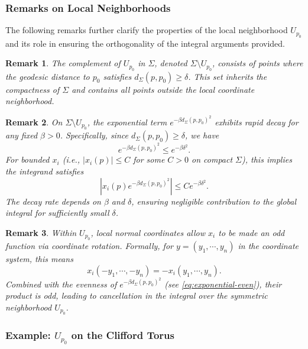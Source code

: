 \documentclass[a4, 12pt]{amsart}
\numberwithin{equation}{section} \numberwithin{equation}{section}
\newtheorem{rem}{Remark}[section]{\bfseries\upshape}
\begin{document}
\subsubsection{Remarks on Local Neighborhoods}

The following remarks further clarify the properties of the local neighborhood $U_{p_0}$ and its role in ensuring the orthogonality of the integral arguments provided.
\begin{rem}\label{rem:complement}
The complement of $ U_{p_0} $ in $ \Sigma $, denoted $ \Sigma \setminus U_{p_0} $, consists of points where the geodesic distance to $ p_0 $ satisfies $ d_{\Sigma}(p, p_0) \geq \delta $. This set inherits the compactness of $ \Sigma $ and contains all points outside the local coordinate neighborhood.
\end{rem}

\begin{rem}\label{rem:exponential-decay}
On $ \Sigma \setminus U_{p_0} $, the exponential term $ e^{-\beta d_{\Sigma}(p, p_0)^2} $ exhibits rapid decay for any fixed $ \beta > 0 $. Specifically, since $ d_{\Sigma}(p, p_0) \geq \delta $, we have
\begin{equation*}
e^{-\beta d_{\Sigma}(p, p_0)^2} \leq e^{-\beta \delta^2}.
\end{equation*}
For bounded $ x_i $ (i.e., $ |x_i(p)| \leq C $ for some $ C > 0 $ on compact $ \Sigma $), this implies the integrand satisfies
\begin{equation*}
|x_i(p) e^{-\beta d_{\Sigma}(p, p_0)^2}| \leq C e^{-\beta \delta^2}.
\end{equation*}
The decay rate depends on $ \beta $ and $ \delta $, ensuring negligible contribution to the global integral for sufficiently small $ \delta $.
\end{rem}

\begin{rem}\label{rem:odd-function}
Within $ U_{p_0} $, local normal coordinates allow $ x_i $ to be made an odd function via coordinate rotation. Formally, for $ y = (y_1, \cdots, y_n) $ in the coordinate system, this means
\begin{equation*}
x_i(-y_1, \cdots, -y_n) = -x_i(y_1, \cdots, y_n).
\end{equation*}
Combined with the evenness of $ e^{-\beta d_{\Sigma}(p, p_0)^2} $ (see \eqref{eq:exponential-even}), their product is odd, leading to cancellation in the integral over the symmetric neighborhood $ U_{p_0} $.
\end{rem}
 \subsubsection{Example: $U_{p_0}$ on the Clifford Torus}
\end{document}
